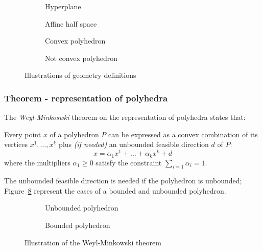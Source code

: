 \documentclass[english]{article}
\begin{document}
\begin{figure}[htbp]
  \bigskip
  \centering
  \begin{subfigure}[b]{0.495\textwidth}
    \centering
    \bigskip
    \caption{Hyperplane}
    \label{subfig:hyperplane}
    \bigskip
  \end{subfigure}
  \bigskip
  \begin{subfigure}[b]{0.495\textwidth}
    \centering
    \bigskip
    \caption{Affine half space}
    \label{subfig:affine-half-space}
    \bigskip
  \end{subfigure}
  \begin{subfigure}[h]{0.495\textwidth}
    \centering
    \bigskip
    \caption{Convex polyhedron}
    \label{subfig:convex-hull}
    \bigskip
  \end{subfigure}
  \begin{subfigure}[h]{0.495\textwidth}
    \centering
    \bigskip
    \caption{Not convex polyhedron}
    \label{subfig:not-convex-hull}
    \bigskip
  \end{subfigure}
  \caption{Illustrations of \LP geometry definitions}
  \label{fig:lp-geometry}
  \bigskip
\end{figure}

\subsubsection{Theorem - representation of polyhedra}

The \textit{Weyl-Minkoswki} theorem on the representation of polyhedra states that:

Every point \(x\) of a polyhedron \(P\) can be expressed as a convex combination of its vertices \(x^1, \ldots, x^k\) plus \textit{(if needed)} an unbounded feasible direction \(d\) of \(P\):
\[ x = \alpha_1 x^1 + \ldots + \alpha_k x^k + d \]
where the multipliers \(\alpha_1 \geq 0\) satisfy the constraint \(\displaystyle\sum_{i=1} \alpha_i = 1\).

\bigskip
The unbounded feasible direction is needed if the polyhedron is unbounded; Figure~\ref{fig:weyl-minkowski-theorem} represent the cases of a bounded and unbounded polyhedron.

\begin{figure}
  \centering
  \bigskip
  \begin{subfigure}[h]{0.495\textwidth}
    \centering
    \bigskip
    \caption{Unbounded polyhedron}
    \label{subfig:unbounded-polyhedron}
    \bigskip
  \end{subfigure}
  \begin{subfigure}[h]{0.495\textwidth}
    \centering
    \bigskip
    \caption{Bounded polyhedron}
    \label{subfig:bounded-polyhedron}
    \bigskip
  \end{subfigure}
  \caption{Illustration of the Weyl-Minkowski theorem}
  \label{fig:weyl-minkowski-theorem}
  \bigskip
\end{figure}
\end{document}
